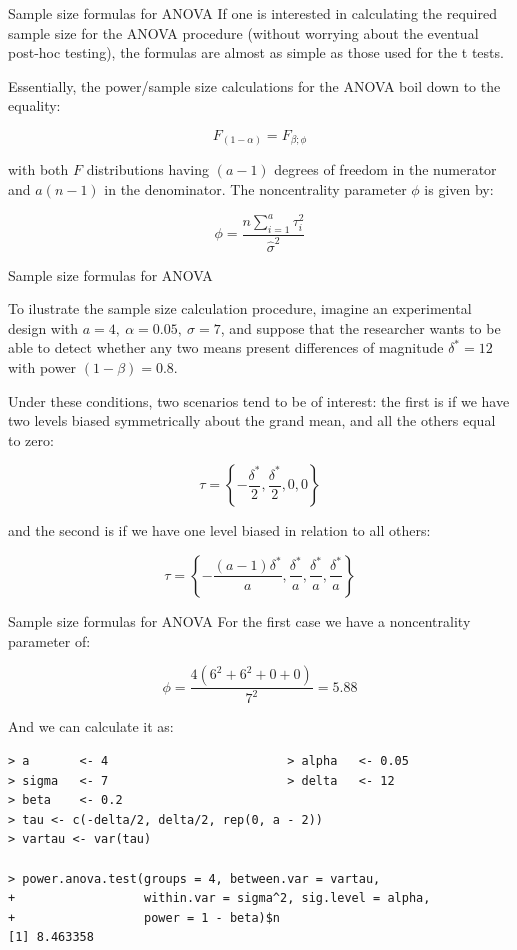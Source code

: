 \begin{frame}{Sample size formulas for ANOVA}
If one is interested in calculating the required sample size for the ANOVA procedure (without worrying about the eventual post-hoc testing), the formulas are almost as simple as those used for the t tests.\bigskip

Essentially, the power/sample size calculations for the ANOVA boil down to the equality:

\begin{equation*}
F_{(1-\alpha)} = F_{\beta;\phi}
\end{equation*}

with both $F$ distributions having $(a-1)$ degrees of freedom in the numerator and $a(n-1)$ in the denominator. The noncentrality parameter $\phi$ is given by:

\begin{equation*}
\phi = \frac{n\sum\limits_{i=1}^{a}\tau_i^2}{\hat{\sigma}^2}
\end{equation*}
\end{frame}

\begin{frame}{Sample size formulas for ANOVA}

To ilustrate the sample size calculation procedure, imagine an experimental design with $a = 4,\ \alpha = 0.05,\ \hat{\sigma} = 7$, and suppose that the researcher wants to be able to detect whether any two means present differences of magnitude $\delta^* = 12$ with power $(1-\beta)=0.8$.\bigskip

Under these conditions, two scenarios tend to be of interest: the first is if we have two levels biased symmetrically about the grand mean, and all the others equal to zero:

$$ \tau = \left\{-\frac{\delta^*}{2}, \frac{\delta^*}{2}, 0, 0\right\}$$

\noindent and the second is if we have one level biased in relation to all others:

$$ \tau = \left\{-\frac{(a-1)\delta^*}{a}, \frac{\delta^*}{a}, \frac{\delta^*}{a}, \frac{\delta^*}{a}\right\}$$
\end{frame}



\begin{frame}[fragile]{Sample size formulas for ANOVA}
For the first case we have a noncentrality parameter of:

$$\phi = \frac{4\left(6^2+6^2+0+0\right)}{7^2} = 5.88$$

And we can calculate it as:

{\smaller
\begin{verbatim}
> a       <- 4                         > alpha   <- 0.05
> sigma   <- 7                         > delta   <- 12
> beta    <- 0.2
> tau <- c(-delta/2, delta/2, rep(0, a - 2))
> vartau <- var(tau)

> power.anova.test(groups = 4, between.var = vartau,
+                  within.var = sigma^2, sig.level = alpha,
+                  power = 1 - beta)$n
[1] 8.463358
\end{verbatim}}
\end{frame}

